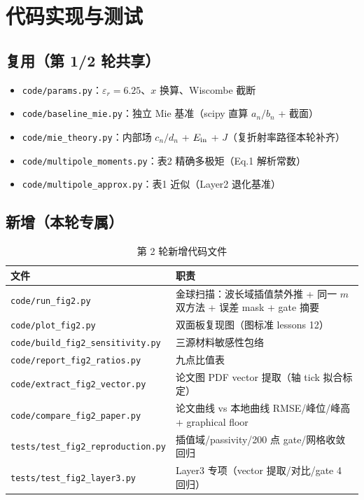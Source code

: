\section{代码实现与测试}

\subsection{复用（第 1/2 轮共享）}

\begin{itemize}
  \item \texttt{code/params.py}：$\varepsilon_r=6.25$、$x$ 换算、Wiscombe 截断 \cite{Wiscombe1980}
  \item \texttt{code/baseline\_mie.py}：独立 Mie 基准（scipy 直算 $a_n/b_n$ + 截面）
  \item \texttt{code/mie\_theory.py}：内部场 $c_n/d_n$ + $E_{\rm in}$ + $J$（复折射率路径本轮补齐）
  \item \texttt{code/multipole\_moments.py}：表2 精确多极矩（Eq.1 解析常数）
  \item \texttt{code/multipole\_approx.py}：表1 近似（Layer2 退化基准）
\end{itemize}

\subsection{新增（本轮专属）}

\begin{table}[H]
\centering
\small
\begin{tabular}{ll}
\toprule
文件 & 职责 \\
\midrule
\texttt{code/run\_fig2.py} & 金球扫描：波长域插值禁外推 + 同一 $m$ 双方法 + 误差 mask + gate 摘要 \\
\texttt{code/plot\_fig2.py} & 双面板复现图（图标准 lessons 12） \\
\texttt{code/build\_fig2\_sensitivity.py} & 三源材料敏感性包络 \\
\texttt{code/report\_fig2\_ratios.py} & 九点比值表 \\
\texttt{code/extract\_fig2\_vector.py} & 论文图 PDF vector 提取（轴 tick 拟合标定） \\
\texttt{code/compare\_fig2\_paper.py} & 论文曲线 vs 本地曲线 RMSE/峰位/峰高 + graphical floor \\
\texttt{tests/test\_fig2\_reproduction.py} & 插值域/passivity/200 点 gate/网格收敛回归 \\
\texttt{tests/test\_fig2\_layer3.py} & Layer3 专项（vector 提取/对比/gate 4 回归） \\
\bottomrule
\end{tabular}
\caption{第 2 轮新增代码文件}
\end{table}

